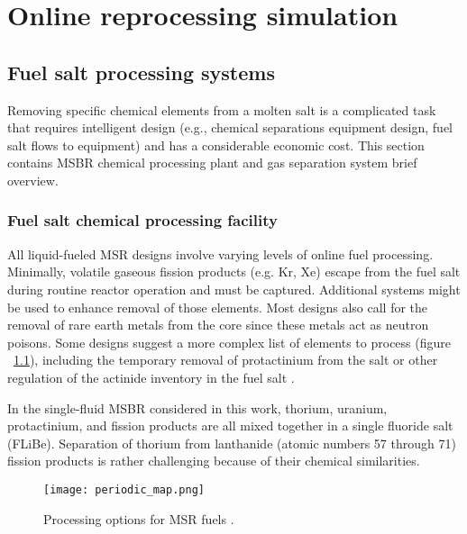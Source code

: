 \chapter[Online reprocessing simulation]{Online reprocessing simulation}

\section{Fuel salt processing systems}
Removing specific chemical elements from a molten salt is a complicated task that requires intelligent design (e.g., chemical separations equipment design, fuel salt flows to equipment) and has a considerable economic cost. This section contains \gls{MSBR} chemical processing plant and gas separation system brief overview.

\subsection{Fuel salt chemical processing facility}
All liquid-fueled \gls{MSR} designs involve varying levels of online fuel processing. Minimally, volatile gaseous fission products (e.g. Kr, Xe) escape from the fuel salt during routine reactor operation and must be captured. Additional systems might be used to enhance removal of those elements. Most designs also call for the removal of rare earth metals from the core since these metals act as neutron poisons. Some designs suggest a more complex list of elements to process (figure ~\ref{fig:periodic_tab}), including the temporary removal of protactinium from the salt or other regulation of the actinide inventory in the fuel salt \cite{ahmad_neutronics_2015}.

In the single-fluid \gls{MSBR} considered in this work, thorium, uranium, protactinium, and fission products are all mixed together in a single fluoride salt (FLiBe). Separation of thorium from lanthanide (atomic numbers 57 through 71) fission products is rather challenging because of their chemical similarities. 
\begin{figure}[htp!] %
  \centering
  \vspace{-0.3em}
  \texttt{[image: periodic\_map.png]}
  \caption{Processing options for \gls{MSR} fuels \cite{ahmad_neutronics_2015}.}
  \vspace{-0.6em}
  \label{fig:periodic_tab}
\end{figure}
\FloatBarrier

